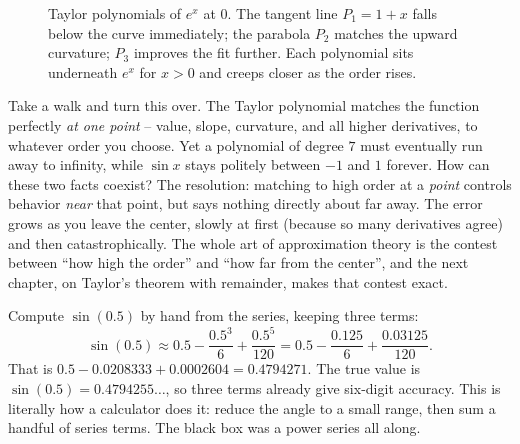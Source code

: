 \begin{figure}[H]
\centering
{}
\caption{Taylor polynomials of $e^x$ at $0$. The tangent line $P_1=1+x$ falls below the curve immediately; the parabola $P_2$ matches the upward curvature; $P_3$ improves the fit further. Each polynomial sits underneath $e^x$ for $x>0$ and creeps closer as the order rises.}
\label{ch30:fig-exp-taylor}
\end{figure}

\begin{walkbox}
Take a walk and turn this over. The Taylor polynomial matches the function perfectly \emph{at one point} -- value, slope, curvature, and all higher derivatives, to whatever order you choose. Yet a polynomial of degree $7$ must eventually run away to infinity, while $\sin x$ stays politely between $-1$ and $1$ forever. How can these two facts coexist? The resolution: matching to high order at a \emph{point} controls behavior \emph{near} that point, but says nothing directly about far away. The error grows as you leave the center, slowly at first (because so many derivatives agree) and then catastrophically. The whole art of approximation theory is the contest between ``how high the order'' and ``how far from the center'', and the next chapter, on Taylor's theorem with remainder, makes that contest exact.
\end{walkbox}

\begin{labbox}
Compute $\sin(0.5)$ by hand from the series, keeping three terms:
\[
  \sin(0.5) \approx 0.5 - \frac{0.5^3}{6} + \frac{0.5^5}{120}
  = 0.5 - \frac{0.125}{6} + \frac{0.03125}{120}.
\]
That is $0.5 - 0.0208333 + 0.0002604 = 0.4794271$. The true value is $\sin(0.5) = 0.4794255\ldots$, so three terms already give six-digit accuracy. This is literally how a calculator does it: reduce the angle to a small range, then sum a handful of series terms. The black box was a power series all along.
\end{labbox}

